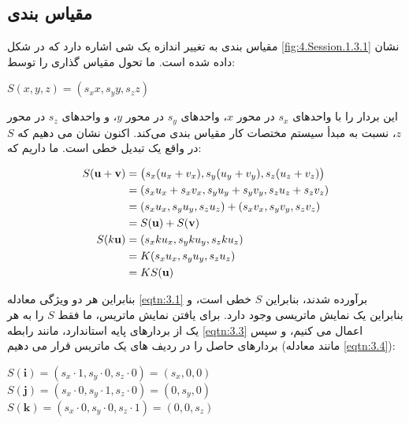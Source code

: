 \subsection{\textbf{مقیاس بندی}}
\label{subsec:3.1.3}
{
    \Large
    \begin{spacing}{1.5}
        مقیاس بندی به تغییر اندازه یک شی اشاره دارد که در شکل \ref{fig:4.Session.1.3.1} نشان داده شده است.
        ما تحول مقیاس گذاری را توسط:

        \begin{center}
            $S(x,y,z)=(s_{x}x,s_{y}y,s_{z}z)$
        \end{center}

        این بردار را با واحدهای $s_x$ در محور $x$، واحدهای $s_y$ در محور $y$، و واحدهای $s_z$ در محور $z$،
        نسبت به مبدأ سیستم مختصات کار مقیاس بندی می‌کند.
        اکنون نشان می دهیم که $S$ در واقع یک تبدیل خطی است. ما داریم که:

        \begin{equation*}
            \centering
            \begin{split}
                S(\textbf{u}+\textbf{v})&=\left( s_{x}(u_{x}+v_{x}), s_{y}(u_{y}+v_{y}), s_{z}(u_{z}+v_{z}) \right) \\
                &=(s_{x}u_{x}+s_{x}v_{x}, s_{y}u_{y}+s_{y}v_{y}, s_{z}u_{z}+s_{z}v_{z}) \\
                &=(s_{x}u_{x}, s_{y}u_{y}, s_{z}u_{z})+(s_{x}v_{x}, s_{y}v_{y}, s_{z}v_{z}) \\
                &=S(\textbf{u})+S(\textbf{v}) \\
                S(k\textbf{u})&=(s_{x}ku_{x}, s_{y}ku_{y}, s_{z}ku_{z}) \\
                &=K(s_{x}u_{x}, s_{y}u_{y}, s_{z}u_{z}) \\
                &=KS(\textbf{u}) \\
            \end{split}
        \end{equation*}

        بنابراین هر دو ویژگی معادله \ref{eqtn:3.1} برآورده شدند، بنابراین $S$ خطی است،
        و بنابراین یک نمایش ماتریسی وجود دارد. برای یافتن نمایش ماتریس، ما فقط $S$ را به هر یک از بردارهای پایه استاندارد، مانند رابطه \ref{eqtn:3.3} اعمال می کنیم،
        و سپس بردارهای حاصل را در ردیف های یک ماتریس قرار می دهیم (مانند معادله \ref{eqtn:3.4}):

        \begin{center}
            $S(\textbf{i})=(s_x\cdot 1,s_y\cdot 0,s_z\cdot 0)=(s_x,0,0)$ \\
            $S(\textbf{j})=(s_x\cdot 0,s_y\cdot 1,s_z\cdot 0)=(0,s_y,0)$ \\
            $S(\textbf{k})=(s_x\cdot 0,s_y\cdot 0,s_z\cdot 1)=(0,0,s_z)$
        \end{center}


\end{spacing}}
